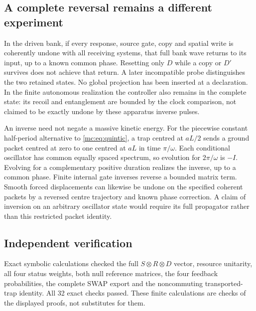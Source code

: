 \documentclass[11pt,oneside,openany]{book}
\theoremstyle{definition}
\theoremstyle{remark}\newtheorem{remark}[theorem]{Remark}
\begin{document}
\subsection{A complete reversal remains a different experiment}
In the driven bank, if every response, source gate, copy and spatial write is coherently undone with all receiving systems, that full bank wave returns to its input, up to a known common phase. Resetting only $D$ while a copy or $D'$ survives does not achieve that return. A later incompatible probe distinguishes the two retained states. No global projection has been inserted at a declaration. In the finite autonomous realization the controller also remains in the complete state: its recoil and entanglement are bounded by the clock comparison, not claimed to be exactly undone by these apparatus inverse pulses.

An inverse need not negate a massive kinetic energy. For the piecewise constant half-period alternative to \eqref{mc:eq:quintic}, a trap centred at $aL/2$ sends a ground packet centred at zero to one centred at $aL$ in time $\pi/\omega$. Each conditional oscillator has common equally spaced spectrum, so evolution for $2\pi/\omega$ is $-I$. Evolving for a complementary positive duration realizes the inverse, up to a common phase. Finite internal gate inverses reverse a bounded matrix term. Smooth forced displacements can likewise be undone on the specified coherent packets by a reversed centre trajectory and known phase correction. A claim of inversion on an arbitrary oscillator state would require its full propagator rather than this restricted packet identity.

\subsection{Independent verification}
Exact symbolic calculations checked the full $S\otimes R\otimes D$ vector, resource unitarity, all four status weights, both null reference matrices, the four feedback probabilities, the complete SWAP export and the noncommuting transported-trap identity. All 32 exact checks passed. These finite calculations are checks of the displayed proofs, not substitutes for them.
\end{document}
